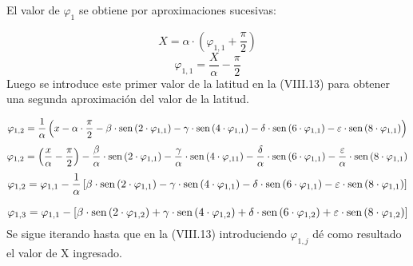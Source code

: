 \documentclass{tufte-book}
\newcommand\normalsubformula[1]{\text{\mathversion{normal}$#1$}}
\begin{document}
El valor de  ${\varphi _{{1}}}$ se obtiene por aproximaciones sucesivas:

\begin{equation*}
{X=\alpha \cdot \left(\varphi _{{1,1}}+\frac{\pi }{2}\right)}
\end{equation*}
\begin{equation*}
{\varphi _{{1,1}}=\frac{X}{\alpha }-\frac{\pi }{2}}
\end{equation*}
Luego se introduce este primer valor de la latitud en la (VIII.13) para
obtener una segunda aproximación del valor de la latitud.

\begin{equation*}
{\varphi _{{1,2}}=\frac{1}{\alpha }\left(x-\alpha \cdot {\frac{\pi
}{2}}-\beta \cdot \normalsubformula{\text{sen}}\left(2\cdot \varphi
_{{1,1}}\right)-\gamma \cdot \normalsubformula{\text{sen}}\left(4\cdot
\varphi _{{1,1}}\right)-\delta \cdot
\normalsubformula{\text{sen}}\left(6\cdot \varphi
_{{1,1}}\right)-\varepsilon \cdot
\normalsubformula{\text{sen}}\left(8\cdot \varphi
_{{1,1}}\right)\right)}
\end{equation*}
\begin{equation*}
{\varphi _{{1,2}}=\left(\frac{x}{\alpha }-\frac{\pi
}{2}\right)-\frac{\beta }{\alpha }\cdot
\normalsubformula{\text{sen}}\left(2\cdot \varphi
_{{1,1}}\right)-\frac{\gamma }{\alpha }\cdot
\normalsubformula{\text{sen}}\left(4\cdot \varphi
_{{,\text{11}}}\right)-\frac{\delta }{\alpha }\cdot
\normalsubformula{\text{sen}}\left(6\cdot \varphi
_{{1,1}}\right)-\frac{\varepsilon }{\alpha }\cdot
\normalsubformula{\text{sen}}\left(8\cdot \varphi _{{1,1}}\right)}
\end{equation*}
\begin{equation*}
{\varphi _{{1,2}}=\varphi _{{1,1}}-\frac{1}{\alpha }\left[\beta \cdot
\normalsubformula{\text{sen}}\left(2\cdot \varphi
_{{1,1}}\right)-\gamma \cdot \normalsubformula{\text{sen}}\left(4\cdot
\varphi _{{1,1}}\right)-\delta \cdot
\normalsubformula{\text{sen}}\left(6\cdot \varphi
_{{1,1}}\right)-\varepsilon \cdot
\normalsubformula{\text{sen}}\left(8\cdot \varphi
_{{1,1}}\right)\right]}
\end{equation*}

\begin{equation*}
{\varphi _{{1,3}}=\varphi _{{1,1}}-\left[\beta \cdot
\normalsubformula{\text{sen}}\left(2\cdot \varphi
_{{1,2}}\right)+\gamma \cdot \normalsubformula{\text{sen}}\left(4\cdot
\varphi _{{1,2}}\right)+\delta \cdot
\normalsubformula{\text{sen}}\left(6\cdot \varphi
_{{1,2}}\right)+\varepsilon \cdot
\normalsubformula{\text{sen}}\left(8\cdot \varphi
_{{1,2}}\right)\right]}
\end{equation*}
Se sigue iterando hasta que en la (VIII.13) introduciendo  ${\varphi
_{{1,j}}}$ dé como resultado el valor de X ingresado.
\end{document}
